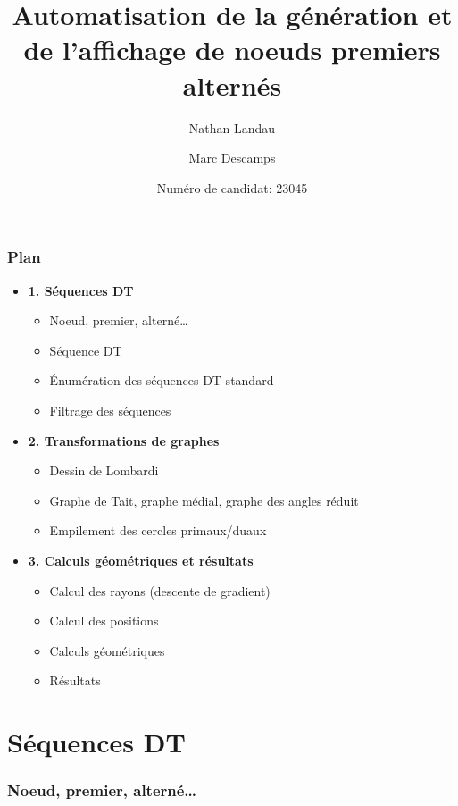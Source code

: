 \documentclass{beamer}
\begin{document}
\title{Automatisation de la génération et de l'affichage de noeuds premiers alternés}

\author{Nathan Landau \and Marc Descamps}
\date{Numéro de candidat: 23045}

\begin{frame}
\maketitle
\end{frame}

\begin{frame}
\frametitle{Plan}
\begin{itemize}
    \item \textbf{1. Séquences DT}
    \begin{itemize}
        \item Noeud, premier, alterné…
        \item Séquence DT
        \item Énumération des séquences DT standard
        \item Filtrage des séquences
    \end{itemize}

    \item \textbf{2. Transformations de graphes}
    \begin{itemize}
        \item Dessin de Lombardi
        \item Graphe de Tait, graphe médial, graphe des angles réduit
        \item Empilement des cercles primaux/duaux
    \end{itemize}

    \item \textbf{3. Calculs géométriques et résultats}
    \begin{itemize}
        \item Calcul des rayons (descente de gradient)
        \item Calcul des positions
        \item Calculs géométriques
        \item Résultats
    \end{itemize}
\end{itemize}
\end{frame}


\section{Séquences DT}
\begin{frame}[plain,c]
\frametitle{Noeud, premier, alterné…}
\centering

\end{frame}
\end{document}
